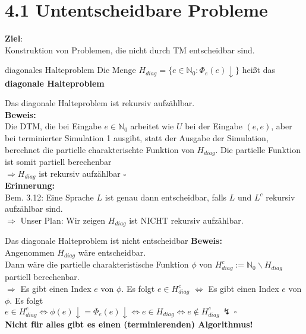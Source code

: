
\section*{4.1 Untentscheidbare Probleme}

\textbf{Ziel}: \\
Konstruktion von Problemen, die nicht durch TM entscheidbar sind.

\begin{defn}{diagonales Halteproblem}
    Die Menge $H_{diag} = \{e \in \mathbb{N}_0 : \Phi_e(e) \downarrow\}$ heißt das \textbf{diagonale Halteproblem}
\end{defn}

\begin{prop}{}
    Das diagonale Halteproblem ist rekursiv aufzählbar. \\
    
    \textbf{Beweis:} \\
    Die DTM, die bei Eingabe $e \in \mathbb{N}_0$ arbeitet wie $U$ bei
    der Eingabe $(e,e)$, aber bei terminierter Simulation 1 ausgibt, statt der
    Ausgabe der Simulation, berechnet die partielle charakterischte Funktion von $H_{diag}$.
    Die partielle Funktion ist somit partiell berechenbar \\
    $\Rightarrow H_{diag}$ ist rekursiv aufzählbar $\square$ \\

    \textbf{Erinnerung:} \\
    Bem. 3.12: Eine Sprache $L$ ist genau dann entscheidbar, falls $L$ und $L^c$
    rekursiv aufzählbar sind. \\

    $\Rightarrow$ Unser Plan: Wir zeigen $H_{diag}$ ist NICHT rekursiv aufzählbar.
\end{prop}

\begin{satz}{Das diagonale Halteproblem ist nicht entscheidbar}
    \textbf{Beweis:} \\
    Angenommen $H_{diag}$ wäre entscheidbar. \\
    Dann wäre die partielle charakteristische Funktion $\phi$ von $H_{diag}^c := \mathbb{N}_0 \backslash H_{diag}$
    partiell berechenbar. \\

    $\Rightarrow$ Es gibt einen Index $e$ von $\phi$. Es folgt $e \in H_{diag}^c$
    $\Leftrightarrow$ Es gibt einen Index $e$ von $\phi$. Es folgt \\
    $e \in H_{diag}^c \Leftrightarrow \phi(e)\downarrow = \Phi_e(e)\downarrow \Leftrightarrow e \in H_{diag} \Leftrightarrow e \notin H_{diag}^c \, \lightning \, \square$ \\

    \textbf{Nicht für alles gibt es einen (terminierenden) Algorithmus!}
\end{satz}

